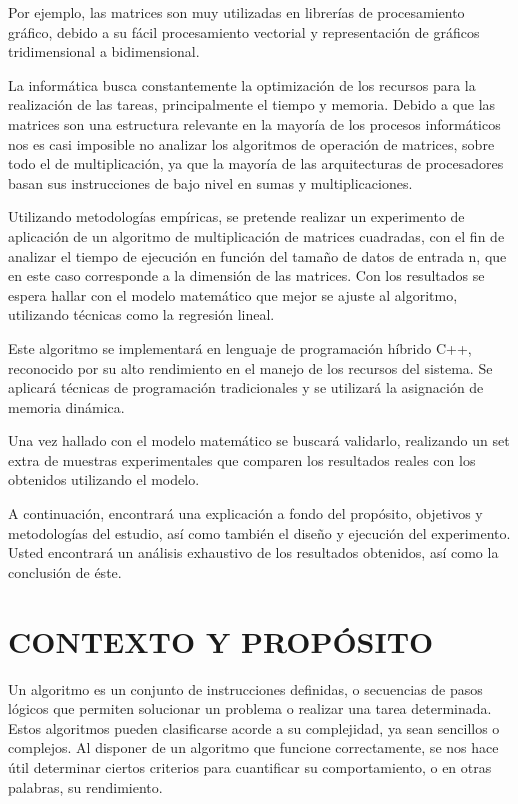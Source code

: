 \documentclass[11pt, twocolumn]{llncs}
\begin{document}
Por ejemplo, las matrices son muy utilizadas en librerías de procesamiento gráfico, debido a su fácil procesamiento vectorial y representación de gráficos tridimensional a bidimensional. 

La informática busca constantemente la optimización de los recursos para la realización de las tareas, principalmente el tiempo y memoria. Debido a que las matrices son una estructura relevante en la mayoría de los procesos informáticos nos es casi imposible no analizar los algoritmos de operación de matrices, sobre todo el de multiplicación, ya que la mayoría de las arquitecturas de procesadores basan sus instrucciones de bajo nivel en sumas y multiplicaciones. 

Utilizando metodologías empíricas, se pretende realizar un experimento de aplicación de un algoritmo de multiplicación de matrices cuadradas, con el fin de analizar el tiempo de ejecución en función del tamaño de datos de entrada n, que en este caso corresponde a la dimensión de las matrices. Con los resultados se espera hallar con el modelo matemático que mejor se ajuste al algoritmo, utilizando técnicas como la regresión lineal. 

Este algoritmo se implementará en lenguaje de programación híbrido C++, reconocido por su alto rendimiento en el manejo de los recursos del sistema. Se aplicará técnicas de programación tradicionales y se utilizará la asignación de memoria dinámica.

Una vez hallado con el modelo matemático se buscará validarlo, realizando un set extra de muestras experimentales que comparen los resultados reales con los obtenidos utilizando el modelo.

A continuación, encontrará una explicación a fondo del propósito, objetivos y metodologías del estudio, así como también el diseño y ejecución del experimento. Usted encontrará un análisis exhaustivo de los resultados obtenidos, así como la conclusión de éste.

\section{CONTEXTO Y PROPÓSITO}\label{contexto_proposito}

Un algoritmo es un conjunto de instrucciones definidas, o secuencias de pasos lógicos que permiten solucionar un problema o realizar una tarea determinada. Estos algoritmos pueden clasificarse acorde a su complejidad, ya sean sencillos o complejos. Al disponer de un algoritmo que funcione correctamente, se nos hace útil determinar ciertos criterios para cuantificar su comportamiento, o en otras palabras, su rendimiento.
\end{document}

